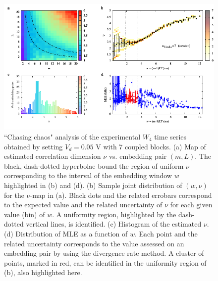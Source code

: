 \begin{figure}[H]
    \centering
    \includegraphics[width=\linewidth]{../blocks/7_blocks/middle/2e5_points/plots/chaos_low.pdf}
    \caption{``Chasing chaos" analysis of the experimental $W_4$ time series obtained by setting $V_d=0.05$ V with 7 coupled blocks.
    (a) Map of estimated correlation dimension $\nu$ vs. embedding pair $(m, L)$.
    The black, dash-dotted hyperbolae bound the region of uniform $\nu$ corresponding to the interval of the
    embedding window $w$ highlighted in (b) and (d).
    (b) Sample joint distribution of $(w,\nu)$ for the $\nu$-map in (a).
    Black dots and the related errobars correspond to the expected value and the related uncertainty of $\nu$
    for each given value (bin) of $w$. A uniformity region, highlighted by the dash-dotted vertical lines,
    is identified. (c) Histogram of the estimated $\nu$. (d) Distribution of MLE as a function of $w$. Each point and the related
    uncertainty corresponds to the value assessed on an embedding pair by using the divergence rate method.
    A cluster of points, marked in red, can be identified in the uniformity region of (b), also highlighted here.}
    \label{fig:7 blocks chaos middle}
\end{figure}


